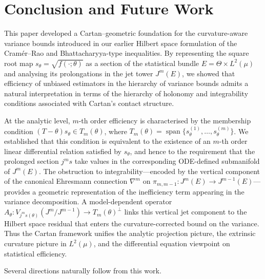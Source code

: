 \documentclass[3p,times]{elsarticle}
\begin{document}
\section{Conclusion and Future Work}
\label{sec:future}
This paper developed a Cartan–geometric foundation for the curvature-aware
variance bounds introduced in our earlier Hilbert space formulation of the
Cramér–Rao and Bhattacharyya-type inequalities.  
By representing the square root map 
$s_\theta=\sqrt{f(\cdot;\theta)}$ as a section of the statistical bundle
$E=\Theta\times L^{2}(\mu)$ and analysing its prolongations in the jet tower
$J^{m}(E)$, we showed that efficiency of unbiased estimators in the hierarchy of variance bounds admits a natural interpretation in terms of the hierarchy of holonomy and integrability
conditions associated with Cartan’s contact structure.  

At the analytic level, $m$-th order efficiency is characterised by the
membership condition $(T-\theta)s_\theta \in T_m(\theta)$, where
$T_m(\theta)=\operatorname{span}\{s_\theta^{(1)},\dots,s_\theta^{(m)}\}$.  
We established that this condition is equivalent to the existence of an
$m$-th order linear differential relation satisfied by $s_\theta$, and hence to
the requirement that the prolonged section $j^m s$ take values in the
corresponding ODE-defined submanifold of $J^m(E)$.  
The obstruction to integrability---encoded by the vertical component of the
canonical Ehresmann connection $\nabla^{m}$ on
$\pi_{m,m-1}:J^{m}(E)\to J^{m-1}(E)$---provides a geometric representation of
the inefficiency term appearing in the variance decomposition.  
A model-dependent operator  
$A_\theta: V_{j^ms(\theta)}(J^m/J^{m-1}) \to T_m(\theta)^\perp$  
links this vertical jet component to the Hilbert space residual that enters the
curvature-corrected bound on the variance.  
Thus the Cartan framework unifies the analytic projection picture, the
extrinsic curvature picture in $L^2(\mu)$, and the differential equation viewpoint
on statistical efficiency.

Several directions naturally follow from this work.
\end{document}
